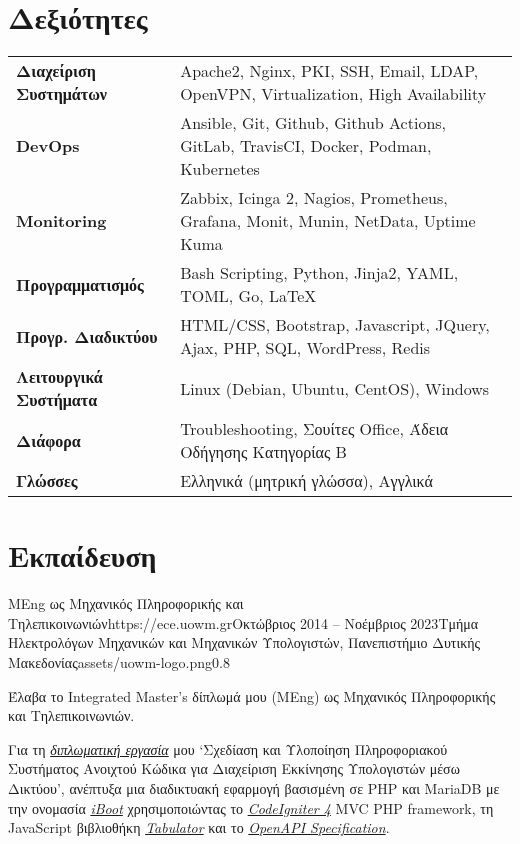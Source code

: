 \documentclass{mycv}
\begin{document}
	\section{Δεξιότητες}
	\begin{tabular}{m{4.5cm} m{12.5cm}}
		\textbf{Διαχείριση Συστημάτων} & Apache2, Nginx, PKI, SSH, Email, LDAP, OpenVPN, Virtualization, High Availability \\
		\textbf{DevOps}	               & Ansible, Git, Github, Github Actions, GitLab, TravisCI, Docker, Podman, Kubernetes \\
		\textbf{Monitoring}            & Zabbix, Icinga 2, Nagios, Prometheus, Grafana, Monit, Munin, NetData, Uptime Kuma \\
		\textbf{Προγραμματισμός} 	   & Bash Scripting, Python, Jinja2, YAML, TOML, Go, \LaTeX \\
		\textbf{Προγρ. Διαδικτύου}	   & HTML/CSS, Bootstrap, Javascript, JQuery, Ajax, PHP, SQL, WordPress, Redis \\
		\textbf{Λειτουργικά Συστήματα} & Linux (Debian, Ubuntu, CentOS), Windows \\
		\textbf{Διάφορα}        	   & Troubleshooting, Σουίτες Office, Άδεια Οδήγησης Κατηγορίας Β \\
		\textbf{Γλώσσες} 			   & Ελληνικά (μητρική γλώσσα), Αγγλικά 
	\end{tabular}

	\section{Εκπαίδευση}
	\begin{EntryDatedLogo}{MEng ως Μηχανικός Πληροφορικής και Τηλεπικοινωνιών}{https://ece.uowm.gr}{Οκτώβριος 2014 -- Νοέμβριος 2023}{Τμήμα Ηλεκτρολόγων Μηχανικών και Μηχανικών Υπολογιστών, Πανεπιστήμιο Δυτικής Μακεδονίας}{assets/uowm-logo.png}{0.8}
		\begin{Itemize}
			\item Έλαβα το Integrated Master's δίπλωμά μου (MΕng) ως Μηχανικός Πληροφορικής και Τηλεπικοινωνιών.
			\item Για τη \href{https://github.com/ChrisKar96/Thesis}{\textit{διπλωματική εργασία}} μου `Σχεδίαση και Υλοποίηση Πληροφοριακού Συστήματος Ανοιχτού Κώδικα για Διαχείριση Εκκίνησης Υπολογιστών μέσω Δικτύου', ανέπτυξα μια διαδικτυακή εφαρμογή βασισμένη σε PHP και MariaDB με την ονομασία \href{https://github.com/ChrisKar96/iBoot-Thesis}{\textit{iBoot}} χρησιμοποιώντας το \href{https://codeigniter.com/}{\textit{CodeIgniter 4}} MVC PHP framework, τη JavaScript βιβλιοθήκη \href{https://tabulator.info/}{\textit{Tabulator}} και το \href{https://swagger.io/specification/}{\textit{OpenAPI Specification}}.
		\end{Itemize}
	\end{EntryDatedLogo}
\end{document}
